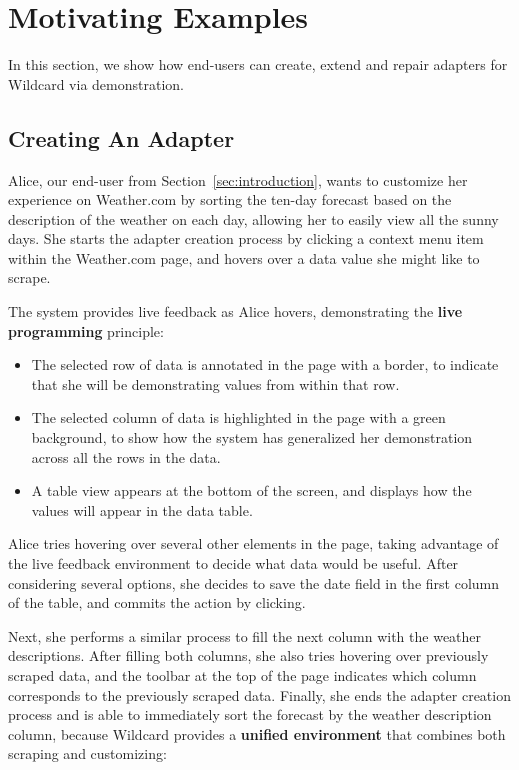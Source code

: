 \documentclass[sigconf,10pt]{acmart}
\providecommand{\tightlist}{%
  \setlength{\itemsep}{0pt}\setlength{\parskip}{0pt}}
\begin{document}
\hypertarget{sec:demos}{%
\section{Motivating Examples}\label{sec:demos}}

In this section, we show how end-users can create, extend and repair
adapters for Wildcard via demonstration.

\hypertarget{creating-an-adapter}{%
\subsection{Creating An Adapter}\label{creating-an-adapter}}

Alice, our end-user from Section~\ref{sec:introduction}, wants to
customize her experience on Weather.com by sorting the ten-day forecast
based on the description of the weather on each day, allowing her to
easily view all the sunny days. She starts the adapter creation process
by clicking a context menu item within the Weather.com page, and hovers
over a data value she might like to scrape.

The system provides live feedback as Alice hovers, demonstrating the
\textbf{live programming} principle:

\begin{itemize}
\tightlist
\item
  The selected row of data is annotated in the page with a border, to
  indicate that she will be demonstrating values from within that row.
\item
  The selected column of data is highlighted in the page with a green
  background, to show how the system has generalized her demonstration
  across all the rows in the data.
\item
  A table view appears at the bottom of the screen, and displays how the
  values will appear in the data table.
\end{itemize}

Alice tries hovering over several other elements in the page, taking
advantage of the live feedback environment to decide what data would be
useful. After considering several options, she decides to save the date
field in the first column of the table, and commits the action by
clicking.

Next, she performs a similar process to fill the next column with the
weather descriptions. After filling both columns, she also tries
hovering over previously scraped data, and the toolbar at the top of the
page indicates which column corresponds to the previously scraped data.
Finally, she ends the adapter creation process and is able to
immediately sort the forecast by the weather description column, because
Wildcard provides a \textbf{unified environment} that combines both
scraping and customizing:
\end{document}
